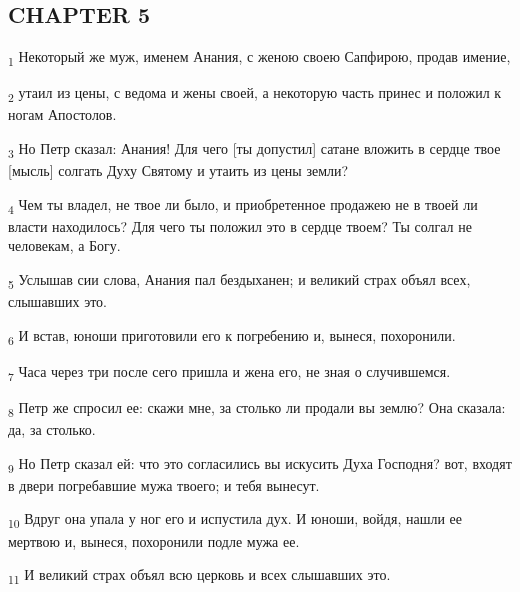 \subsection{CHAPTER 5}
\begin{tcolorbox}
\textsubscript{1} Некоторый же муж, именем Анания, с женою своею Сапфирою, продав имение,
\end{tcolorbox}
\begin{tcolorbox}
\textsubscript{2} утаил из цены, с ведома и жены своей, а некоторую часть принес и положил к ногам Апостолов.
\end{tcolorbox}
\begin{tcolorbox}
\textsubscript{3} Но Петр сказал: Анания! Для чего [ты допустил] сатане вложить в сердце твое [мысль] солгать Духу Святому и утаить из цены земли?
\end{tcolorbox}
\begin{tcolorbox}
\textsubscript{4} Чем ты владел, не твое ли было, и приобретенное продажею не в твоей ли власти находилось? Для чего ты положил это в сердце твоем? Ты солгал не человекам, а Богу.
\end{tcolorbox}
\begin{tcolorbox}
\textsubscript{5} Услышав сии слова, Анания пал бездыханен; и великий страх объял всех, слышавших это.
\end{tcolorbox}
\begin{tcolorbox}
\textsubscript{6} И встав, юноши приготовили его к погребению и, вынеся, похоронили.
\end{tcolorbox}
\begin{tcolorbox}
\textsubscript{7} Часа через три после сего пришла и жена его, не зная о случившемся.
\end{tcolorbox}
\begin{tcolorbox}
\textsubscript{8} Петр же спросил ее: скажи мне, за столько ли продали вы землю? Она сказала: да, за столько.
\end{tcolorbox}
\begin{tcolorbox}
\textsubscript{9} Но Петр сказал ей: что это согласились вы искусить Духа Господня? вот, входят в двери погребавшие мужа твоего; и тебя вынесут.
\end{tcolorbox}
\begin{tcolorbox}
\textsubscript{10} Вдруг она упала у ног его и испустила дух. И юноши, войдя, нашли ее мертвою и, вынеся, похоронили подле мужа ее.
\end{tcolorbox}
\begin{tcolorbox}
\textsubscript{11} И великий страх объял всю церковь и всех слышавших это.
\end{tcolorbox}
